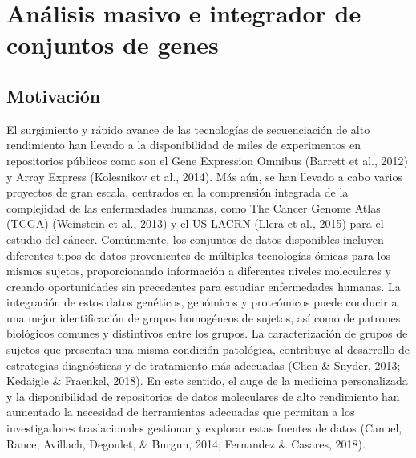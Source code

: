 \documentclass[12pt,twoside]{reedthesis}
\begin{document}
\hypertarget{cap:migsa}{%
\chapter{Análisis masivo e integrador de conjuntos de genes}\label{cap:migsa}}

\hypertarget{motivaciuxf3n-1}{%
\section{Motivación}\label{motivaciuxf3n-1}}

\par

El surgimiento y rápido avance de las tecnologías de secuenciación de alto rendimiento han llevado a la disponibilidad de miles de experimentos en repositorios públicos como son el Gene Expression Omnibus (Barrett et al., 2012) y Array Express (Kolesnikov et al., 2014). Más aún, se han llevado a cabo varios proyectos de gran escala, centrados en la comprensión integrada de la complejidad de las enfermedades humanas, como The Cancer Genome Atlas (TCGA) (Weinstein et al., 2013) y el US-LACRN (Llera et al., 2015) para el estudio del cáncer. Comúnmente, los conjuntos de datos disponibles incluyen diferentes tipos de datos provenientes de múltiples tecnologías ómicas para los mismos sujetos, proporcionando información a diferentes niveles moleculares y creando oportunidades sin precedentes para estudiar enfermedades humanas. La integración de estos datos genéticos, genómicos y proteómicos puede conducir a una mejor identificación de grupos homogéneos de sujetos, así como de patrones biológicos comunes y distintivos entre los grupos. La caracterización de grupos de sujetos que presentan una misma condición patológica, contribuye al desarrollo de estrategias diagnósticas y de tratamiento más adecuadas (Chen \& Snyder, 2013; Kedaigle \& Fraenkel, 2018). En este sentido, el auge de la medicina personalizada y la disponibilidad de repositorios de datos moleculares de alto rendimiento han aumentado la necesidad de herramientas adecuadas que permitan a los investigadores traslacionales gestionar y explorar estas fuentes de datos (Canuel, Rance, Avillach, Degoulet, \& Burgun, 2014; Fernandez \& Casares, 2018).

\par
\end{document}
